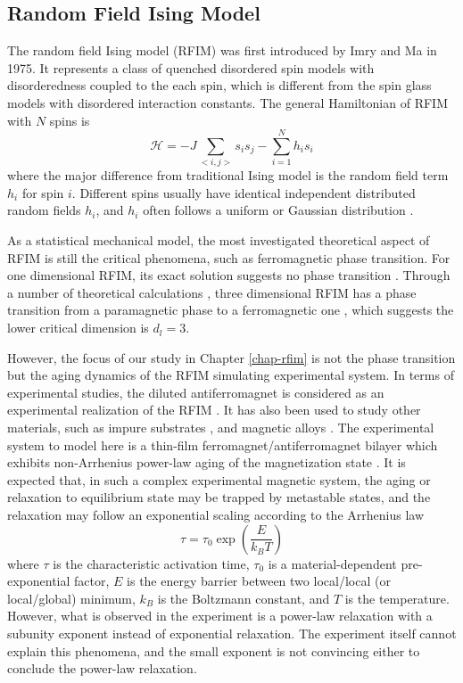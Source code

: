 \subsection{Random Field Ising Model}
\label{sec:intro-rfim}
The random field Ising model (RFIM) was first introduced by Imry and Ma \cite{imry1975random} in 1975. It represents a class of quenched disordered spin models \cite{young1997spin} with  disorderedness coupled to the each spin, which is different from the spin glass models with disordered interaction constants. The general Hamiltonian of RFIM with $N$ spins is
\begin{equation}
\mathcal{H}=-J\sum_{<i,j>}s_{i}s_{j}-\sum_{i=1}^{N}h_{i}s_{i}
\end{equation}
where the major difference from traditional Ising model is the random field term $h_i$ for spin $i$. Different spins usually have  identical independent distributed random fields $h_i$, and $h_i$ often follows a uniform \cite{nattermann1997theory} or Gaussian distribution \cite{newman1999}.

As a statistical mechanical model, the most investigated theoretical aspect of RFIM is still the critical phenomena, such as ferromagnetic phase transition. For one dimensional RFIM, its exact solution suggests no phase transition \cite{grinstein1983exact}. Through a number of theoretical calculations \cite{parisi1979random, bricmont1987lower}, three dimensional RFIM has a phase transition from a paramagnetic phase to a ferromagnetic one  \cite{bricmont1987lower}, which suggests the lower critical dimension is $d_l = 3$. 

However, the focus of our study in Chapter \ref{chap-rfim} is not the phase transition but the aging dynamics of the RFIM simulating experimental system. In terms of experimental studies, the diluted antiferromagnet is considered as an experimental realization of the RFIM \cite{belanger1985, fernandez1988random}. It has also been used to study other materials, such as  impure substrates \cite{villain1982commensurate}, and magnetic alloys \cite{fisher1988theory}. 
The experimental system to model here is a thin-film ferromagnet/antiferromagnet bilayer which exhibits non-Arrhenius power-law aging of the magnetization state \cite{ma2016prb}. 
It is expected that, in such a complex experimental magnetic system, the aging or relaxation to equilibrium state may be trapped by metastable states, and the relaxation may follow an exponential scaling according to the Arrhenius law \cite{Arrhenius1989}
\begin{equation}
\tau = \tau_0 \exp \left( \frac{E}{k_B T}\right)
\end{equation}
where $\tau$ is the characteristic activation time, $\tau_0$ is a material-dependent pre-exponential factor, $E$ is the energy barrier between two local/local (or local/global) minimum, $k_B$ is the Boltzmann constant, and $T$ is the temperature. However, what is observed in the experiment is a power-law relaxation with a subunity exponent instead of exponential relaxation. The experiment itself cannot explain this phenomena, and the small exponent is not convincing either to conclude the power-law relaxation. 

